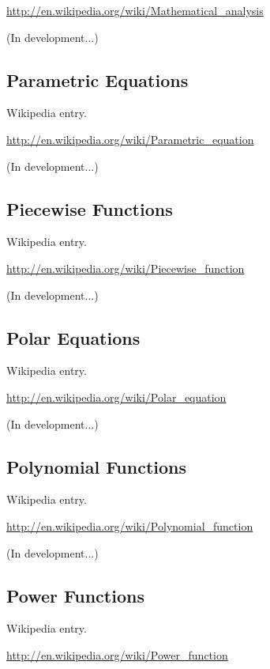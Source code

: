 \documentclass[12pt,oneside]{book}
\begin{document}
\href{http://en.wikipedia.org/wiki/Mathematical_analysis}{http://en.wikipedia.org/wiki/Mathematical\_analysis}

(In development...)

\subsection[Parametric Equations]{Parametric Equations}

Wikipedia entry.

\href{http://en.wikipedia.org/wiki/Parametric_equation}{http://en.wikipedia.org/wiki/Parametric\_equation}

(In development...)

\subsection[Piecewise Functions]{Piecewise Functions}

Wikipedia entry.

\href{http://en.wikipedia.org/wiki/Piecewise_function}{http://en.wikipedia.org/wiki/Piecewise\_function}

(In development...)

\subsection[Polar Equations]{Polar Equations}

Wikipedia entry.

\href{http://en.wikipedia.org/wiki/Polar_equation}{http://en.wikipedia.org/wiki/Polar\_equation}

(In development...)

\subsection[Polynomial Functions]{Polynomial Functions}

Wikipedia entry.

\href{http://en.wikipedia.org/wiki/Polynomial_function}{http://en.wikipedia.org/wiki/Polynomial\_function}

(In development...)

\subsection[Power Functions]{Power Functions}

Wikipedia entry.

\href{http://en.wikipedia.org/wiki/Power_function}{http://en.wikipedia.org/wiki/Power\_function}
\end{document}
